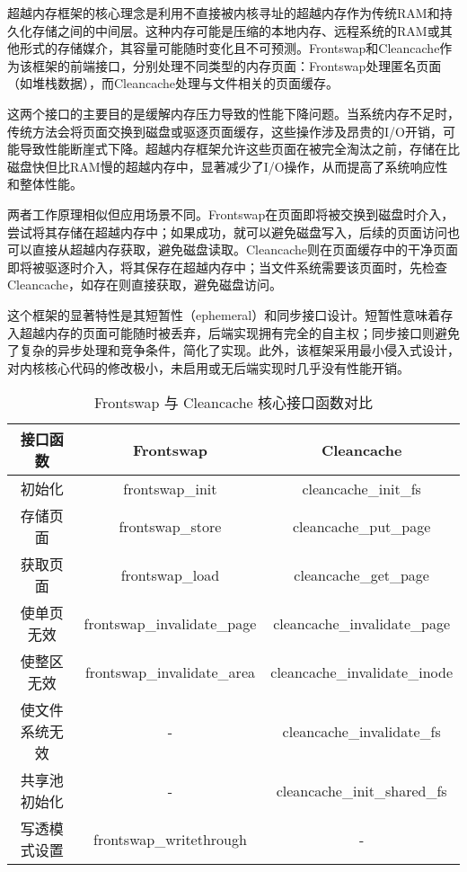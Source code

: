 超越内存框架的核心理念是利用不直接被内核寻址的超越内存作为传统RAM和持久化存储之间的中间层。这种内存可能是压缩的本地内存、远程系统的RAM或其他形式的存储媒介，其容量可能随时变化且不可预测。Frontswap和Cleancache作为该框架的前端接口，分别处理不同类型的内存页面：Frontswap处理匿名页面（如堆栈数据），而Cleancache处理与文件相关的页面缓存。

这两个接口的主要目的是缓解内存压力导致的性能下降问题。当系统内存不足时，传统方法会将页面交换到磁盘或驱逐页面缓存，这些操作涉及昂贵的I/O开销，可能导致性能断崖式下降。超越内存框架允许这些页面在被完全淘汰之前，存储在比磁盘快但比RAM慢的超越内存中，显著减少了I/O操作，从而提高了系统响应性和整体性能。

两者工作原理相似但应用场景不同。Frontswap在页面即将被交换到磁盘时介入，尝试将其存储在超越内存中；如果成功，就可以避免磁盘写入，后续的页面访问也可以直接从超越内存获取，避免磁盘读取。Cleancache则在页面缓存中的干净页面即将被驱逐时介入，将其保存在超越内存中；当文件系统需要该页面时，先检查Cleancache，如存在则直接获取，避免磁盘访问。

这个框架的显著特性是其短暂性（ephemeral）和同步接口设计。短暂性意味着存入超越内存的页面可能随时被丢弃，后端实现拥有完全的自主权；同步接口则避免了复杂的异步处理和竞争条件，简化了实现。此外，该框架采用最小侵入式设计，对内核核心代码的修改极小，未启用或无后端实现时几乎没有性能开销。



\begin{table}[htbp]
    \caption{Frontswap 与 Cleancache 核心接口函数对比}
    \begin{tabularx}{\textwidth}{ccc} %
    \toprule
    \textbf{接口函数} & \textbf{Frontswap} & \textbf{Cleancache} \\
    \midrule
    初始化 & frontswap\_init & cleancache\_init\_fs \\
    
    存储页面 & frontswap\_store & cleancache\_put\_page \\
    
    获取页面 & frontswap\_load & cleancache\_get\_page \\
    
    使单页无效 & frontswap\_invalidate\_page & cleancache\_invalidate\_page \\
    
    使整区无效 & frontswap\_invalidate\_area & cleancache\_invalidate\_inode \\
    
    使文件系统无效 & - & cleancache\_invalidate\_fs \\
    
    共享池初始化 & - & cleancache\_init\_shared\_fs \\
    
    写透模式设置 & frontswap\_writethrough & - \\
    \bottomrule
    \end{tabularx}
    \end{table}


